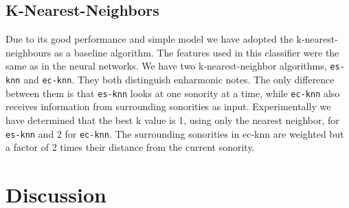 \documentclass{article}
\newcommand{\comment}[1]{}
\begin{document}
\subsection{K-Nearest-Neighbors}
\label{sec:knn}

\comment{
  ==> baseline (similar a pardo, templates automaticos)
  ==> good theoretical performance (citar \cite{fix.ea:important}) 
  ==> very good practical performance (citar
  \cite{gomez.ea:estimating})
  ==> dizer valor de k, peso do contexto
}

Due to its good performance \cite{fix.ea:important,
  gomez.ea:estimating} and simple model we have adopted the
k-nearest-neighbours as a baseline algorithm. The features used in
this classifier were the same as in the neural networks. We have two
k-nearest-neighbor algorithms, \texttt{es-knn} and
\texttt{ec-knn}. They both distinguish enharmonic notes. The only
difference between them is that \texttt{es-knn} looks at one sonority
at a time, while \texttt{ec-knn} also receives information from
surrounding sonorities as input. Experimentally we have determined
that the best k value is 1, using only the nearest neighbor, for
\texttt{es-knn} and 2 for \texttt{ec-knn}. The surrounding sonorities
in ec-knn are weighted but a factor of 2 times their distance from the
current sonority.

\section{Discussion}
\label{sec:discussion}
\end{document}
